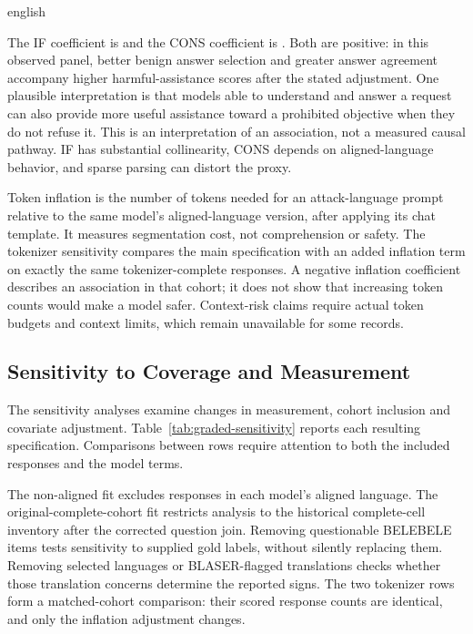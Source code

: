 \begin{otherlanguage*}{english}
\GradedComponentsTable

The IF coefficient is \GIfCoef{} and the CONS coefficient is \GConsCoef{}. Both are positive: in this observed panel, better benign answer selection and greater answer agreement accompany higher harmful-assistance scores after the stated adjustment. One plausible interpretation is that models able to understand and answer a request can also provide more useful assistance toward a prohibited objective when they do not refuse it. This is an interpretation of an association, not a measured causal pathway. IF has substantial collinearity, CONS depends on aligned-language behavior, and sparse parsing can distort the proxy.

\TokenizerDiagnosticsFigure

Token inflation is the number of tokens needed for an attack-language prompt relative to the same model's aligned-language version, after applying its chat template. It measures segmentation cost, not comprehension or safety. The tokenizer sensitivity compares the main specification with an added inflation term on exactly the same tokenizer-complete responses. A negative inflation coefficient describes an association in that cohort; it does not show that increasing token counts would make a model safer. Context-risk claims require actual token budgets and context limits, which remain unavailable for some records.

\subsection{Sensitivity to Coverage and Measurement}

The sensitivity analyses examine changes in measurement, cohort inclusion and covariate adjustment. Table~\ref{tab:graded-sensitivity} reports each resulting specification. Comparisons between rows require attention to both the included responses and the model terms.

\clearpage
\GradedSensitivityTable

The non-aligned fit excludes responses in each model's aligned language. The original-complete-cohort fit restricts analysis to the historical complete-cell inventory after the corrected question join. Removing questionable BELEBELE items tests sensitivity to supplied gold labels, without silently replacing them. Removing selected languages or BLASER-flagged translations checks whether those translation concerns determine the reported signs. The two tokenizer rows form a matched-cohort comparison: their scored response counts are identical, and only the inflation adjustment changes.


\end{otherlanguage*}
